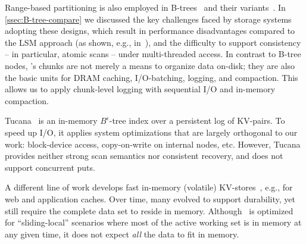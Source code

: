 Range-based  partitioning is also employed in  B-trees~\cite{Knuth:1998:ACP:280635} and their variants~\cite{Brodal:2003:LBE:644108.644201}. In
 \cref{ssec:B-tree-compare} we discussed the key challenges faced by storage systems adopting these designs, which 
 result in performance disadvantages compared to the LSM approach  (as shown, e.g., in~\cite{toku-rocks-inno}), 
 and the difficulty to support consistency  -- in particular, atomic scans --   under multi-threaded access.
 In contrast to B-tree nodes, \sys's chunks are not merely  a means to organize data on-disk; they 
are also the basic units for DRAM caching, I/O-batching, logging, and compaction. 
This allows us to apply chunk-level logging with sequential I/O and in-memory compaction.
 

Tucana~\cite{tucana} is an in-memory $B^{\epsilon}$-tree index over a persistent log of KV-pairs. To speed up I/O, it
applies  system optimizations that are largely orthogonal to our work: block-device  access, copy-on-write on internal nodes, etc. However, Tucana provides neither strong scan semantics nor consistent recovery, and does not support concurrent puts.

A different line of work develops fast
in-memory (volatile) KV-stores~\cite{ignite, redis, memcached, Srinivasan:2016:AAR:3007263.3007276}, 
e.g., for web and application caches. Over time, many evolved to support durability,
yet still require the complete data set to reside in memory.
Although \sys\ is optimized for ``sliding-local'' scenarios where most of the active working set is in memory at any given time, it does not expect \emph{all} the data to fit in memory. 

